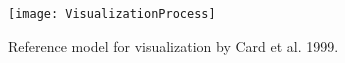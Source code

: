 \begin{figure}[t]
  \texttt{[image: VisualizationProcess]}
  \caption[Reference model for visualization]{Reference model for visualization by Card et al. 1999. \cite{card_readings_1999}}
  \label{fig:vizprocess}
  \centering
\end{figure}